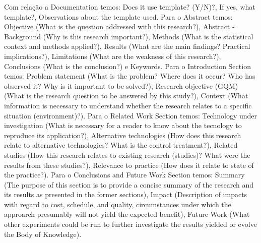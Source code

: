 Com relação a Documentation temos: Does it use template? (Y/N)?,  If yes, what template?, Observations about the template used. Para o Abstract temos: Objective (What is the question addressed with this research?), Abstract - Background (Why is this research important?), Methods (What is the statistical context and methods applied?), Results (What are the main findings? Practical implications?), Limitations (What are the weakness of this research?), Conclusions (What is the conclusion?) e Keywords. Para o Introduction Section temos: Problem statement (What is the problem? Where does it occur? Who has observed it? Why is it important to be solved?), Research objective (GQM) (What is the research question to be answered by this study?), Context (What information is necessary to understand whether the research relates to a specific situation (environment)?). Para o Related Work Section temos: Technology under investigation (What is necessary for a reader to know about the tecnology to reproduce its application?), Alternative technologies (How does this research relate to alternative technologies? What is the control treatment?), Related studies (How this research relates to existing research (studies)? What were the results from these studies?), Relevance to practice (How does it relate to state of the practice?). Para o Conclusions and Future Work Section temos: Summary (The purpose of this section is to provide a concise summary of the research and its results as presented in the former sections), Impact (Description of impacts with regard to cost, schedule, and quality, circumstances under which the approarch presumably will not yield the expected benefit), Future Work (What other experiments could be run to further investigate the results yielded or evolve the Body of Knowledge).

